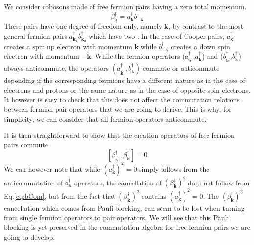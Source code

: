 \documentclass[aps,prb,superscriptaddress,showpacs,reprint,lengthcheck]{revtex4-1}
\newcommand{\vk}{\ensuremath{\mathbf{k}}}
\begin{document}
We consider cobosons made of free fermion pairs having a zero total
momentum. 
\begin{equation}
\beta^{\dagger}_\vk=a^{\dagger}_{\mathbf{k} }b^{\dagger}_{-\mathbf{k} }
\end{equation}
These pairs have one degree of freedom
only, namely $\mathbf{k}$, by contrast to the
most general fermion pairs $a^{\dagger}_{\mathbf{k} _1}b^{\dagger}_{\mathbf{k%
} _2}$ which have two \cite{frenkel}. In the case of Cooper pairs, $a^{\dagger}_{\mathbf{k} }$ creates a spin up electron with momentum $\mathbf{k}$ while $b^{\dagger}_{\mathbf{-k} }$ creates a down spin electron with momentum $\mathbf{-k}$. While the fermion operators ($a^{\dagger}_{\mathbf{k}
^{\prime}}$,$a^{\dagger}_{\mathbf{k} }$) and ($b^{\dagger}_{\mathbf{k}
^{\prime}}$,$b^{\dagger}_{\mathbf{k} }$) always anticommute, the operators $(a^{\dagger}_{\mathbf{k} ^{\prime}},b^{\dagger}_{\mathbf{k} })$ commute or anticommute depending if the corresponding fermions have  a different
nature as in the case of electrons and protons or the same nature as in the case of opposite spin electrons. It however is easy to check that this does not affect the commutation
relations between fermion pair operators that we are going to derive. This is why, for simplicity, we can consider that all fermion operators anticommute. 

It is then straightforward to show that the creation operators of free fermion pairs commute 
\begin{equation}  \label{eq:bCom}
\left[\beta^{\dagger}_{\mathbf{k} ^{\prime}},\beta^{\dagger}_{\mathbf{k} }%
\right]  =0
\end{equation}
We can however note that while ${(a^{\dagger}_{\mathbf{k}})} ^2=0$
simply follows from the anticommutation of $a^{\dagger}_{\mathbf{k} }$
operators, the cancellation of ${(\beta^{\dagger}_{\mathbf{k}})} ^2$ does not follow from Eq.\eqref{eq:bCom}, but from the fact that ${(\beta^{\dagger}_{\mathbf{k}})} ^2$  contains ${(a^{\dagger}_{\mathbf{k}})} ^2=0$. The ${(\beta^{\dagger}_{\mathbf{k}})} ^2$  cancellation which comes from Pauli blocking, can seem to be lost
when turning from single fermion operators to pair operators. We will see that this Pauli blocking is yet preserved in the commutation algebra for
free fermion pairs we are going to develop.
\end{document}
